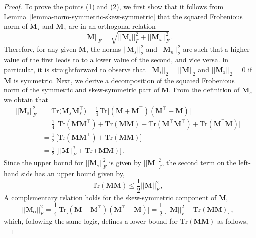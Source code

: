 \begin{proof}
%
To prove the points (1) and (2), we first show that it follows from Lemma~\ref{lemma-norm-symmetric-skew-symmetric} that the squared Frobenious norm of $\bm{M}_s$ and $\bm{M}_n$ are in an orthogonal relation
\begin{equation}
%
    ||\bm{M}||_F  = \sqrt{||\bm{M}_s||^2_F + ||\bm{M}_n||^2_F}\,.
%
\end{equation}
%
Therefore, for any given $\bm{M}$, the norms $||\bm{M}_s||^2_2$ and $||\bm{M}_n||^2_2$ are such that a higher value of the first leads to to a lower value of the second, and vice versa.
%
In particular, it is straightforward to observe that $||\bm{M}_s||_2 = ||\bm{M}||_2$ and $||\bm{M}_n||_2 = 0$ if $\bm{M}$ is symmetric.
%
Next, we derive a decomposition of the squared Frobenious norm of the symmetric and skew-symmetric part of $\bm{M}$.
%
From the definition of $\bm{M}_s$ we obtain that
%
\begin{equation}
\begin{split}
%
    ||\bm{M}_s||^2_F & = \text{Tr}\big(\bm{M}_s\bm{M}^\top_s\big) = \frac14 \, \text{Tr}\big[(\bm{M} + \bm{M}^\top)(\bm{M}^\top + \bm{M})\big]\\
%
    & = \frac14 \, \big[ \text{Tr}(\bm{M}\bm{M}^\top) + \text{Tr}(\bm{M}\bm{M}) + \text{Tr}(\bm{M}^\top\bm{M}^\top) + \text{Tr}(\bm{M}^\top\bm{M})\big] \\
    & = \frac12 \, \big[\text{Tr}(\bm{M}\bm{M}^\top) + \text{Tr}(\bm{M}\bm{M})\big] \\
    & = \frac12 \, \big[ ||\bm{M}||_F^2 + \text{Tr}(\bm{M}\bm{M})\big] \,.
%
\end{split}
\end{equation}
%
Since the upper bound for $ ||\bm{M}_s||^2_F$ is given by $ ||\bm{M}||^2_F$, the second term on the left-hand side has an upper bound given by,
%
\begin{equation}
    \text{Tr}(\bm{M}\bm{M}) \leq \frac12 ||\bm{M}||_F^2 \,,
\end{equation}
%
A complementary relation holds for the skew-symmetric component of $\bm{M}$,
%
\begin{equation}
    ||\bm{M_n}||^2_F = \frac14 \, \text{Tr}\big[(\bm{M} - \bm{M}^\top)(\bm{M}^\top - \bm{M})\big] = \frac12 \, \big[ ||\bm{M}||_F^2 - \text{Tr}(\bm{M}\bm{M})\big] \,,
\end{equation}
%
which, following the same logic, defines a lower-bound for $\text{Tr}(\bm{M}\bm{M})$ as follows,
%
\begin{equation}

\end{equation}
\end{proof}
